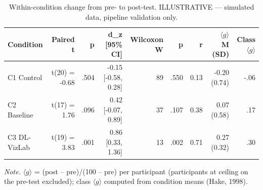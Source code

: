 \begin{table}[htbp]
\centering
\small
\caption{Within-condition change from pre- to post-test. ILLUSTRATIVE — simulated data, pipeline validation only.}
\label{tab:T08}
\begin{tabular}{lrrrrrrrr}
\toprule
Condition & Paired t & p & d\_z [95\% CI] & Wilcoxon W & p & r & $\langle g\rangle$ M (SD) & Class $\langle g\rangle$ \\
\midrule
C1 Control & t(20) = -0.68 & .504 & -0.15 [-0.58, 0.28] & 89 & .550 & 0.13 & -0.20 (0.74) & -.06 \\
C2 Baseline & t(17) = 1.76 & .096 & 0.42 [-0.07, 0.89] & 37 & .107 & 0.38 & 0.07 (0.58) & .17 \\
C3 DL-VizLab & t(19) = 3.83 & .001 & 0.86 [0.33, 1.36] & 13 & .002 & 0.71 & 0.27 (0.32) & .30 \\
\bottomrule
\end{tabular}
\par\smallskip\footnotesize\textit{Note.} $\langle g\rangle$ = (post -- pre)/(100 -- pre) per participant (participants at ceiling on the pre-test excluded); class $\langle g\rangle$ computed from condition means (Hake, 1998).
\end{table}
